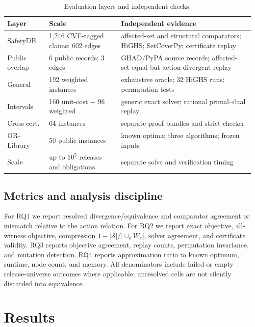 \documentclass[10pt,conference]{IEEEtran}
\newcommand{\Suit}{\mathcal{S}}
\newcommand{\tblfont}{\footnotesize}
\begin{document}
\begin{table}[t]
\centering
\caption{Evaluation layers and independent checks.}
\label{tab:design}
{\tblfont
\begin{tabularx}{\columnwidth}{@{}p{1.35cm}p{2.2cm}Y@{}}
\toprule
Layer & Scale & Independent evidence \\
\midrule
SafetyDB & 1,246 CVE-tagged claims; 602 edges & affected-set and structural comparators; HiGHS; SetCoverPy; certificate replay \\
Public overlap & 6 public records; 3 edges & GHAD/PyPA source records; affected-set-equal but action-divergent replay \\
General & 192 weighted instances & exhaustive oracle; 32 HiGHS runs; permutation tests \\
Intervals & 160 unit-cost + 96 weighted & generic exact solver; rational primal--dual replay \\
Cross-cert. & 64 instances & separate proof bundles and strict checker \\
OR-Library & 50 public instances & known optima; three algorithms; frozen inputs \\
Scale & up to $10^5$ releases and obligations & separate solve and verification timing \\
\bottomrule
\end{tabularx}}
\end{table}

\subsection{Metrics and analysis discipline}
For RQ1 we report resolved divergence/equivalence and comparator agreement or mismatch relative to the action relation. For RQ2 we report exact objective, all-witness objective, compression $1-|\Suit|/|\cup_eW_e|$, solver agreement, and certificate validity. RQ3 reports objective agreement, replay counts, permutation invariance, and mutation detection. RQ4 reports approximation ratio to known optimum, runtime, node count, and memory. All denominators include failed or empty release-universe outcomes where applicable; unresolved cells are not silently discarded into equivalence.

\section{Results}
\end{document}
